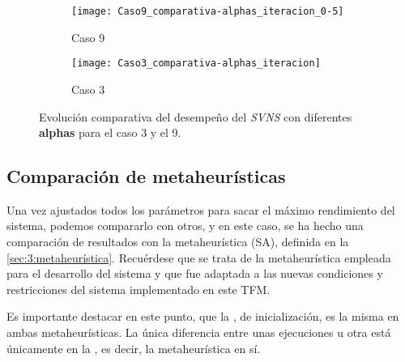 \begin{figure}[h]
	\begin{subfigure}{\linewidth}
	\texttt{[image: Caso9\_comparativa-alphas\_iteracion\_0-5]}
	\caption{Caso 9}
	\label{fig:caso9comparativa-alphasiteracion0-5}
	\centering
	\end{subfigure}

	\begin{subfigure}{\linewidth}
	\texttt{[image: Caso3\_comparativa-alphas\_iteracion]}
	\caption{Caso 3}
	\label{fig:Caso3_comparativa-alphas_iteracion}
	\centering
\end{subfigure}
	\caption{Evolución comparativa del desempeño del \textit{SVNS} con diferentes \textbf{alphas} para el caso 3 y el 9.}
\end{figure}


%
%

\subsection{Comparación de metaheurísticas}

Una vez ajustados todos los parámetros para sacar el máximo rendimiento del sistema, podemos compararlo con otros, y en este caso, se ha hecho una comparación de resultados con la metaheurística \sa{} (SA), definida en la \autoref{sec:3:metaheurística}. Recuérdese que se trata de la metaheurística empleada para el desarrollo del sistema \legacy{} y que fue adaptada a las nuevas condiciones y restricciones del sistema implementado en este TFM.

Es importante destacar en este punto, que la \faseuno{}, de inicialización, es la misma en ambas metaheurísticas. La única diferencia entre unas ejecuciones u otra está únicamente en la \fasedos{}, es decir, la metaheurística en sí.

